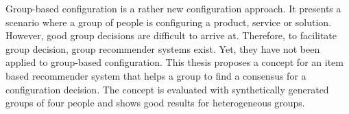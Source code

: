 \Abstract

Group-based configuration is a rather new configuration approach. It presents a scenario where a group of people is configuring a product, service or solution. However, good group decisions are difficult to arrive at. Therefore, to facilitate group decision, group recommender systems exist. Yet, they have not been applied to group-based configuration. This thesis proposes a concept for an item based recommender system that helps a group to find a consensus for a configuration decision. The concept is evaluated with synthetically generated groups of four people and shows good results for heterogeneous groups.